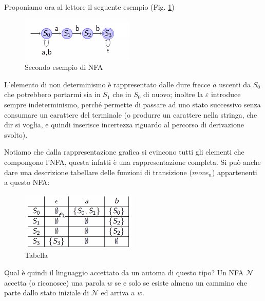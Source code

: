 \documentclass[class=book, crop=false, oneside, 12pt]{standalone}
\begin{document}
Proponiamo ora al lettore il seguente esempio (Fig. \ref{nfa_grafo_2})
\begin{figure}
    \centering
    \includegraphics[width=.5\textwidth,keepaspectratio]{nfa_grafo_2}
    \caption{Secondo esempio di NFA}
    \label{nfa_grafo_2}
\end{figure}
L’elemento di non determinismo è rappresentato dalle dure frecce \(a\) uscenti da \(S_0\) che potrebbero portarmi sia in \(S_1\) che in \(S_0\) di nuovo; inoltre la \(\varepsilon\) introduce sempre indeterminismo, perché permette di passare ad uno stato successivo senza consumare un carattere del terminale (o produrre un carattere nella stringa, che dir si voglia, e quindi inserisce incertezza riguardo al percorso di derivazione svolto).

Notiamo che dalla rappresentazione grafica si evincono tutti gli elementi che compongono l’NFA, questa infatti è una rappresentazione completa.
Si può anche dare una descrizione tabellare delle funzioni di transizione (\(move_n\)) appartenenti a questo NFA:

\begin{figure}
    \centering
    \includegraphics[width=.4\textwidth,keepaspectratio]{tabella}
    \caption{Tabella}
    \label{tabella}
\end{figure}
Qual è quindi il linguaggio accettato da un automa di questo tipo?\label{linguaggio_definito_da_un_automa} 
Un NFA \(\mathcal{N}\) accetta (o riconosce) una parola \(w\) se e solo se esiste almeno un cammino che parte dallo stato iniziale di \(\mathcal{N}\) ed arriva a \(w\).
\end{document}
